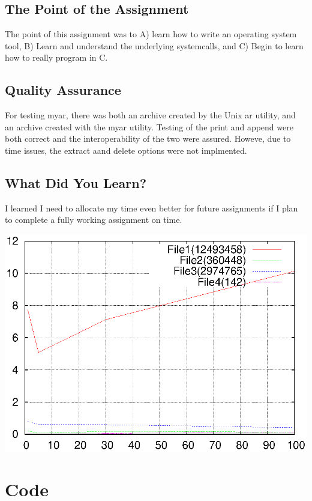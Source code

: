 \documentclass[letterpaper,10pt,titlepage]{article}
\begin{document}
\subsection{The Point of the Assignment}
\label{Point}
The point of this assignment was to A) learn how to write an operating system tool, B) Learn and understand the underlying systemcalls, and C) Begin to learn how to really program in C.
\subsection{Quality Assurance}
\label{QA}
For testing myar, there was both an archive created by the Unix ar utility, and an archive created with the myar utility. Testing of the print and append were both correct and the interoperability of the two were assured. Howeve, due to time issues, the extract aand delete options were not implmented.
\subsection{What Did You Learn?}
\label{Learned}
I learned I need to allocate my time even better for future assignments if I plan to complete a fully working assignment on time.

\includegraphics[width=\textwidth]{plot.eps}


\section{Code}
\label{myar Source Code}

\end{document}
